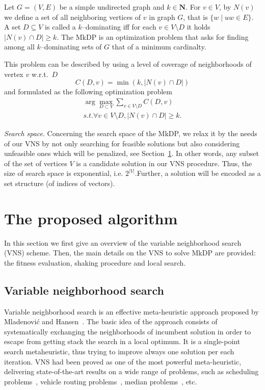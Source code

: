 \documentclass[sigconf]{acmart}
\begin{document}
    Let $G=(V,E)$ be a simple undirected graph and $k \in \mathbf{N}$. For $v\in V$, by $N(v)$ we define a set of all neighboring vertices of $v$ in graph  $G$, that is $\{w \mid uw \in E\}$. A set $D \subseteq V$ is called a $k$--dominating iff for each $v\in V \setminus D$ it holds $|N(v) \cap D| \geq k$.  The MkDP is an optimization problem that asks for finding among all $k$--dominating sets of $G$ that of a minimum cardinalty. 
    
    
    This problem can be described by using a level of coverage of neighborhoods of vertex $v$ w.r.t.\ $D$
    \begin{equation}
    	C(D, v) = \min(k, |N(v) \cap D|)
    \end{equation}
and  formulated as the following optimization problem 
\begin{align}
    \arg \max_{D \subset V } \sum_{v \in V\setminus D} C(D,v) \\
    s.t. \forall v \in V \setminus D, |N(v) \cap D| \geq k.
\end{align}
    
\emph{Search space}.    Concerning the search space of the MkDP, we relax it by the needs of our VNS by not only searching for feasible solutions but also considering unfeasible ones which will be penalized, see Section~\ref{sec:vns}.  In other words, any subset of the set of vertices $V$ is a candidate solution in our VNS procedure. Thus, the size of search space is exponential, i.e. $2^{|V|}$.Further, a solution will be encoded as a set structure (of indices of vectors). 
   
   
\section{The proposed algorithm}\label{sec:vns}

In this section we first give an overview of the variable neighborhood search (VNS) scheme. Then, the main details on the VNS to solve MkDP are provided: the fitness evaluation, shaking procedure and local search.
 
  \subsection{Variable neighborhood search}
 Variable neighborhood search is an effective meta-heuristic approach proposed by Mladenović and Hansen~\cite{mladenovic1997variable}. The basic idea of the approach consists of systematically exchanging the neighborhoods of incumbent solution in order to escape from getting stack the search in a  local optimum. It is a single-point search metaheuristic, thus trying to improve always one solution per each iteration. VNS had been proved as one of the most powerful meta-heuristic, delivering state-of-the-art results on a wide range of problems, such as scheduling problems~\cite{fleszar2004solving}, vehicle routing problems~\cite{rezgui2019application}, median problems~\cite{herran2019variable}, etc.  
  
\end{document}
